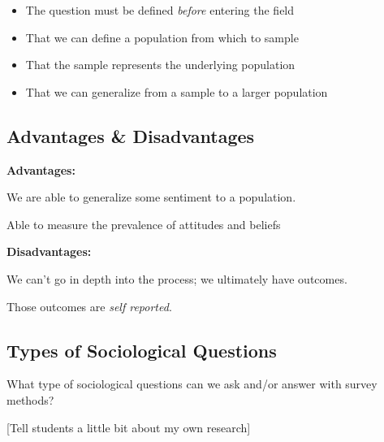 \documentclass[11pt]{lecturenotes}
\begin{document}
\begin{itemize}
\item The question must be defined \emph{before} entering the field
\item That we can define a population from which to sample
\item That the sample represents the underlying population
\item That we can generalize from a sample to a larger population 
\end{itemize}


\subsection[5]{Advantages \& Disadvantages}
\textbf{Advantages:}

We are able to generalize some sentiment to a population. 

Able to measure the prevalence of attitudes and beliefs

\textbf{Disadvantages:}

We can't go in depth into the process; we ultimately have outcomes. 

Those outcomes are \emph{self reported}.

\subsection{Types of Sociological Questions}
What type of sociological questions can we ask and/or answer with survey methods? 

[Tell students a little bit about my own research]



\end{document}

